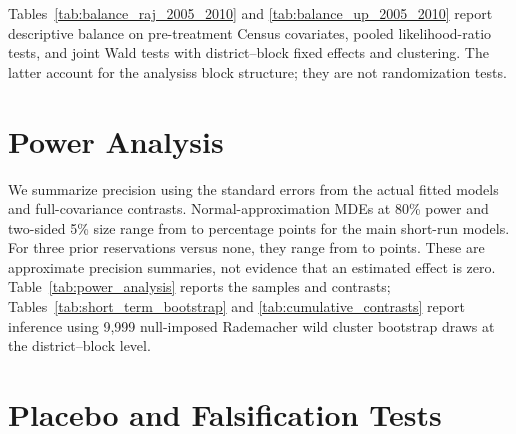 \documentclass[12pt]{article}
\begin{document}
\begin{table}[!htbp]
    \centering
    \caption{Electoral Balance Tests for Quota Assignment Across Election Cycles}
    \label{tab:balance_electoral}
    
\end{table}
\FloatBarrier

Tables~\ref{tab:balance_raj_2005_2010} and \ref{tab:balance_up_2005_2010} report descriptive balance on pre-treatment Census covariates, pooled likelihood-ratio tests, and joint Wald tests with district--block fixed effects and clustering. The latter account for the analysis\textquotesingle{}s block structure; they are not randomization tests.



\FloatBarrier


\clearpage
\section{Power Analysis}\label{sec:app_power}

We summarize precision using the standard errors from the actual fitted models and full-covariance contrasts. Normal-approximation MDEs at 80\% power and two-sided 5\% size range from \shortMdeMin{} to \shortMdeMax{} percentage points for the main short-run models. For three prior reservations versus none, they range from \longMdeMin{} to \longMdeMax{} points. These are approximate precision summaries, not evidence that an estimated effect is zero. Table~\ref{tab:power_analysis} reports the samples and contrasts; Tables~\ref{tab:short_term_bootstrap} and \ref{tab:cumulative_contrasts} report inference using 9,999 null-imposed Rademacher wild cluster bootstrap draws at the district--block level.





\FloatBarrier


\clearpage
\section{Placebo and Falsification Tests}\label{sec:app_placebo}
\end{document}
